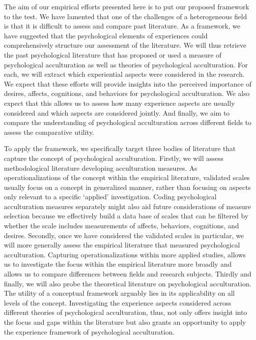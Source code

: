 \documentclass[man, 12pt, a4paper]{apa7}
\begin{document}
The aim of our empirical efforts presented here is to put our proposed framework to the test. We have lamented that one of the challenges of a heterogeneous field is that it is difficult to assess and compare past literature. As a framework, we have suggested that the psychological elements of experiences could comprehensively structure our assessment of the literature. We will thus retrieve the past psychological literature that has proposed or used a measure of psychological acculturation as well as theories of psychological acculturation. For each, we will extract which experiential aspects were considered in the research. We expect that these efforts will provide insights into the perceived importance of desires, affects, cognitions, and behaviors for psychological acculturation. We also expect that this allows us to assess how many experience aspects are usually considered and which aspects are considered jointly. And finally, we aim to compare the understanding of psychological acculturation across different fields to assess the comparative utility. 

To apply the framework, we specifically target three bodies of literature that capture the concept of psychological acculturation. Firstly, we will assess methodological literature developing acculturation measures. As operationalizations of the concept within the empirical literature, validated scales usually focus on a concept in generalized manner, rather than focusing on aspects only relevant to a specific `applied' investigation. Coding psychological acculturation measures separately might also aid future considerations of measure selection because we effectively build a data base of scales that can be filtered by whether the scale includes measurements of affects, behaviors, cognitions, and desires. 
Secondly, once we have considered the validated scales in particular, we will more generally assess the empirical literature that measured psychological acculturation. Capturing operationalizations within more applied studies, allows us to investigate the focus within the empirical literature more broadly and allows us to compare differences between fields and research subjects.
Thirdly and finally, we will also probe the theoretical literature on psychological acculturation. The utility of a conceptual framework arguably lies in its applicability on all levels of the concept. Investigating the experience aspects considered across different theories of psychological acculturation, thus, not only offers insight into the focus and gaps within the literature but also grants an opportunity to apply the experience framework of psychological acculturation.
\end{document}
